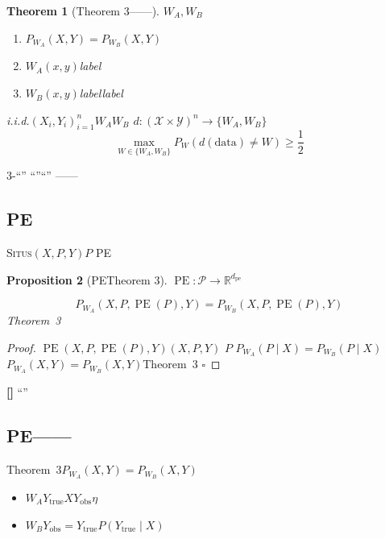 \documentclass[11pt,a4paper]{article}
\newtheorem{theorem}{Theorem}[section]
\newtheorem{proposition}[theorem]{Proposition}
\theoremstyle{remark}
\DeclareMathOperator{\PE}{PE}
\newcommand{\R}{\mathbb{R}}
\newcommand{\Y}{\mathcal{Y}}
\newcommand{\X}{\mathcal{X}}
\newcommand{\Ppos}{\mathcal{P}}
\newcommand{\Situs}{\textsc{Situs}}
\newcommand{\pe}{\mathrm{pe}}
\newcommand{\rigorous}{\textnormal{\textbf{[]}}}
\begin{document}
\begin{theorem}[Theorem 3——]
\label{thm:3_original}
$W_A, W_B$
\begin{enumerate}[label=(\arabic*)]
    \item $P_{W_A}(X, Y) = P_{W_B}(X, Y)$
    \item $W_A$$(x, y)$\textbf{}label
    \item $W_B$$(x, y)$\textbf{}labellabel
\end{enumerate}
i.i.d.$(X_i, Y_i)_{i=1}^n$$W_A$$W_B$
$d: (\X \times \Y)^n \to \{W_A, W_B\}$
\begin{equation}
    \max_{W \in \{W_A, W_B\}} P_W(d(\text{data}) \neq W) \geq \frac{1}{2}
\end{equation}
\end{theorem}

3-``''
``''``''
——

\subsection{PE}

\Situs{}$(X, P, Y)$$P$
\textbf{}PE

\begin{proposition}[PETheorem 3]
\label{prop:4.1}
$\PE: \Ppos \to \R^{d_{\pe}}$\textbf{}

\begin{equation}
    P_{W_A}(X, P, \PE(P), Y) = P_{W_B}(X, P, \PE(P), Y)
\end{equation}
Theorem~3\textbf{}
\end{proposition}

\begin{proof}
$\PE$$(X, P, \PE(P), Y)$$(X, P, Y)$
$P$
$P_{W_A}(P \mid X) = P_{W_B}(P \mid X)$
$P_{W_A}(X, Y) = P_{W_B}(X, Y)$Theorem~3
\hfill $\square$
\end{proof}

\rigorous{} \textbf{}``''


\subsection{PE——}

\textbf{}Theorem~3$P_{W_A}(X, Y) = P_{W_B}(X, Y)$
\textbf{}
\begin{itemize}
    \item $W_A$$Y_{\text{true}}$$X$$Y_{\text{obs}}$$\eta$
    \item $W_B$$Y_{\text{obs}} = Y_{\text{true}}$$P(Y_{\text{true}} \mid X)$
          
\end{itemize}
\end{document}
